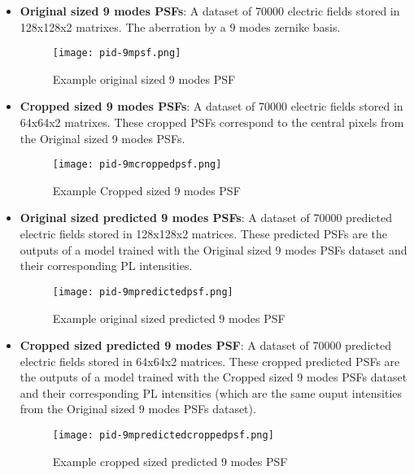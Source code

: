 \begin{itemize}
				\item \textbf{Original sized 9 modes PSFs}: A dataset of 70000 electric fields stored in 128x128x2 matrixes. The aberration by a 9 modes zernike basis.
				\begin{figure*}[ht!]
					\centering
					\texttt{[image: pid-9mpsf.png]}
					\caption{Example original sized 9 modes PSF}\hspace{\fill}
				\end{figure*}				
				\item \textbf{Cropped sized 9 modes PSFs}:  A dataset of 70000 electric fields stored in 64x64x2 matrixes. These cropped  PSFs correspond to the central pixels from the Original sized 9 modes PSFs.
				\begin{figure*}[ht!]
					\centering
					\texttt{[image: pid-9mcroppedpsf.png]}
					\caption{Example Cropped sized 9 modes PSF}\hspace{\fill}
				\end{figure*}			
				\item \textbf{Original sized predicted 9 modes PSFs}:  A dataset of 70000 predicted electric fields stored in 128x128x2 matrices. These predicted PSFs are the outputs of a model trained with the Original sized 9 modes PSFs dataset and their corresponding PL intensities.
				\begin{figure*}[ht!]
					\centering
					\texttt{[image: pid-9mpredictedpsf.png]}
					\caption{Example original sized predicted 9 modes PSF}\hspace{\fill}
				\end{figure*}			
				\item \textbf{Cropped sized predicted 9 modes PSF}: A dataset of 70000 predicted electric fields stored in 64x64x2 matrices. These cropped predicted PSFs are the outputs of a model trained with the Cropped sized 9 modes PSFs dataset and their corresponding PL intensities (which are the same ouput intensities from the Original sized 9 modes PSFs dataset).
				\begin{figure*}[ht!]
					\centering
					\texttt{[image: pid-9mpredictedcroppedpsf.png]}
					\caption{Example cropped sized predicted 9 modes PSF}\hspace{\fill}
				\end{figure*}
				\FloatBarrier
				

\end{itemize}
